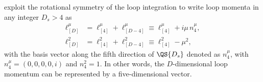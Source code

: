 exploit the rotational symmetry of the loop
integration to write loop momenta in any integer $D_s>4$ as
\begin{subequations}
  \label{eq:loopmom}
  \begin{align}
    \ell^\mu_{[D]} &=   \ell^\mu_{[4]} +   \ell^\mu_{[D-4]} \equiv \ell^\mu_{[4]} + i \mu\,n_4^\mu, \\
    \ell^2_{[D]} &= \ell^2_{[4]} + \ell^{2}_{[D-4]} \equiv \ell^2_{[4]}-\mu^2,
  \end{align}
\end{subequations}
with the basis vector along the fifth direction of $\QS{D_s}$ denoted
as $n^\mu_4$, with $n_4^\mu=(0,0,0,0,i)$ and $n_4^2=1$. 
In other words, the $D$-dimensional loop momentum can be represented
by a five-dimensional vector.


